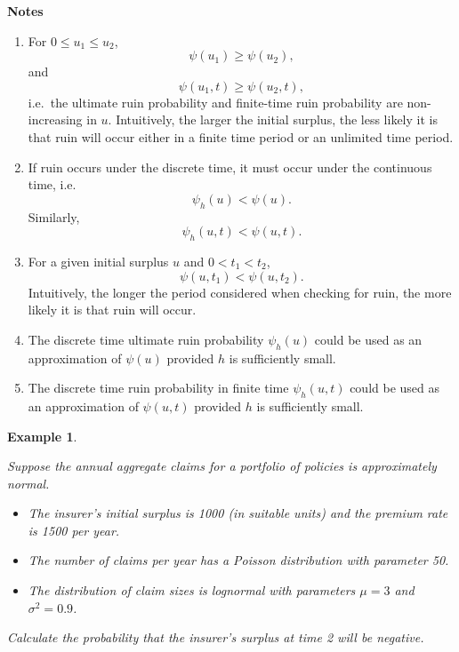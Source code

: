 \documentclass[landscape, 20pt]{extreport}
\theoremstyle{definition}
\theoremstyle{definition}
\newtheorem{example}{Example}[chapter]
\theoremstyle{definition}
\theoremstyle{definition}
\theoremstyle{remark}
\begin{document}
\textbf{Notes}

\begin{enumerate}
\def\labelenumi{\arabic{enumi}.}
\item
  For \(0 \le u_1 \le u_2\), \[\psi(u_1) \ge \psi(u_2),\] and
  \[\psi(u_1,t) \ge \psi(u_2,t),\]
  i.e.~the
  ultimate ruin probability and finite-time ruin probability are non-increasing in \(u\).
  Intuitively, the larger the initial surplus, the less likely it is that ruin will occur either in a finite time period or an unlimited time
  period.
\item
  If ruin occurs under the discrete time, it must occur under the
  continuous time, i.e.~\[\psi_h(u) < \psi(u).\] Similarly,
  \[\psi_h(u,t) < \psi(u,t).\]
\item
  For a given initial surplus \(u\) and \(0 < t_1 < t_2\),
  \[\psi(u,t_1) < \psi(u,t_2).\]
  Intuitively, the longer the period considered when checking for ruin, the more likely it is that ruin will
  occur.
\item
  The discrete time ultimate ruin probability \(\psi_h(u)\) could be
  used as an approximation of \(\psi(u)\) provided \(h\) is sufficiently
  small.
\item
  The discrete time ruin probability in finite time \(\psi_h(u,t)\)
  could be used as an approximation of \(\psi(u,t)\) provided \(h\) is
  sufficiently small.
\end{enumerate}

\newpage \begin{example}
\protect\hypertarget{exm:unlabeled-div-58}{}\label{exm:unlabeled-div-58}

\emph{Suppose the annual aggregate claims for a portfolio of
policies is approximately normal.}

\begin{itemize}
\item
  \emph{The insurer's initial surplus is 1000 (in suitable units) and the
  premium rate is 1500 per year.}
\item
  \emph{The number of claims per year has a Poisson distribution with
  parameter 50.}
\item
  \emph{The distribution of claim sizes is lognormal with parameters
  \(\mu = 3\) and \(\sigma^2 = 0.9\).}
\end{itemize}

\emph{Calculate the probability that the insurer's surplus at time 2 will be
negative.}

\end{example}
\end{document}
